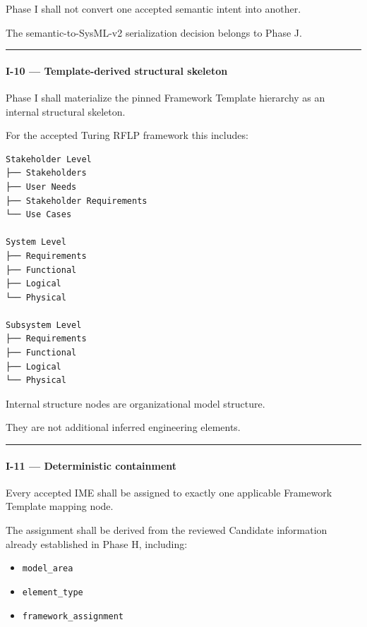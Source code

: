 Phase I shall not convert one accepted semantic intent into another.

The semantic-to-SysML-v2 serialization decision belongs to Phase J.

\begin{center}\rule{0.5\linewidth}{0.5pt}\end{center}

\hypertarget{i-10--template-derived-structural-skeleton}{%
\paragraph{I-10 --- Template-derived structural skeleton}\label{i-10--template-derived-structural-skeleton}}

Phase I shall materialize the pinned Framework Template hierarchy as an internal structural skeleton.

For the accepted Turing RFLP framework this includes:

\begin{verbatim}
Stakeholder Level
├── Stakeholders
├── User Needs
├── Stakeholder Requirements
└── Use Cases

System Level
├── Requirements
├── Functional
├── Logical
└── Physical

Subsystem Level
├── Requirements
├── Functional
├── Logical
└── Physical
\end{verbatim}

Internal structure nodes are organizational model structure.

They are not additional inferred engineering elements.

\begin{center}\rule{0.5\linewidth}{0.5pt}\end{center}

\hypertarget{i-11--deterministic-containment}{%
\paragraph{I-11 --- Deterministic containment}\label{i-11--deterministic-containment}}

Every accepted IME shall be assigned to exactly one applicable Framework Template mapping node.

The assignment shall be derived from the reviewed Candidate information already established in Phase H, including:

\begin{itemize}
\tightlist
\item
  \texttt{model\_area}
\item
  \texttt{element\_type}
\item
  \texttt{framework\_assignment}
\end{itemize}

